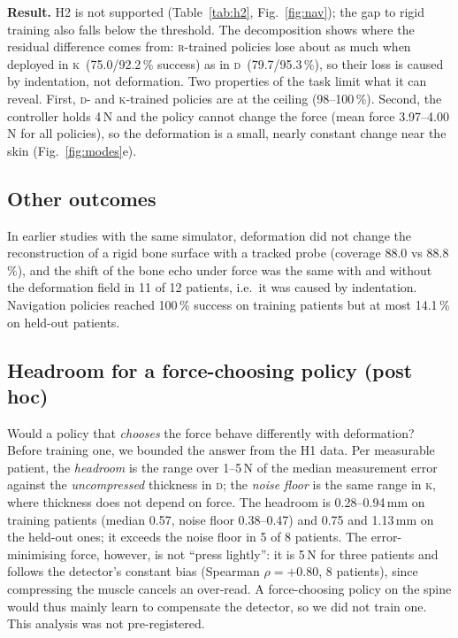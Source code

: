 \documentclass[conference]{IEEEtran}
\newcommand{\RM}{\textsc{r}}   %
\newcommand{\KM}{\textsc{k}}   %
\newcommand{\DM}{\textsc{d}}   %
\begin{document}
\textbf{Result.} H2 is not supported (Table~\ref{tab:h2}, Fig.~\ref{fig:nav}); the gap to rigid training also falls
below the threshold. The decomposition shows where the residual difference comes from: \RM-trained policies lose
about as much when deployed in \KM\ (75.0/92.2\,\% success) as in \DM\ (79.7/95.3\,\%), so their loss is caused by
indentation, not deformation. Two properties of the task limit what it can reveal. First, \DM- and \KM-trained policies
are at the ceiling (98--100\,\%). Second, the controller holds 4\,N and the policy cannot change the force (mean force
3.97--4.00\,N for all policies), so the deformation is a small, nearly constant change near the skin
(Fig.~\ref{fig:modes}e).

\subsection{Other outcomes}
In earlier studies with the same simulator, deformation did not change the reconstruction of a rigid
bone surface with a tracked probe (coverage 88.0 vs 88.8\,\%), and the shift of the bone echo under force was the same
with and without the deformation field in 11 of 12 patients, i.e.\ it was caused by indentation. Navigation policies
reached 100\,\% success on training patients but at most 14.1\,\% on held-out patients.

\subsection{Headroom for a force-choosing policy (post hoc)}
\label{sec:headroom}
Would a policy that \emph{chooses} the force behave differently with deformation? Before training one, we bounded the
answer from the H1 data. Per measurable patient, the \emph{headroom} is the range over 1--5\,N of the median
measurement error against the \emph{uncompressed} thickness in \DM; the \emph{noise floor} is the same range in \KM,
where thickness does not depend on force. The headroom is 0.28--0.94\,mm on training patients (median 0.57, noise
floor 0.38--0.47) and 0.75 and 1.13\,mm on the held-out ones; it exceeds the noise floor in 5 of 8 patients. The
error-minimising force, however, is not ``press lightly'': it is 5\,N for three patients and follows the detector's
constant bias (Spearman $\rho=+0.80$, 8 patients), since compressing the muscle cancels an over-read. A
force-choosing policy on the spine would thus mainly learn to compensate the detector, so we did not train one. This
analysis was not pre-registered.
\end{document}
